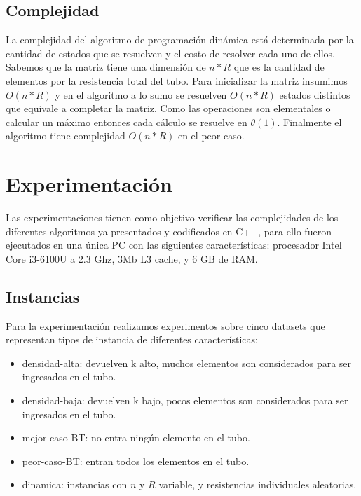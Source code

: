 \documentclass[10pt,a4paper]{article}
\begin{document}
\subsection{Complejidad}
La complejidad del algoritmo de programación dinámica está determinada por la cantidad de estados que se resuelven y el costo de resolver cada uno de ellos.
Sabemos que la matriz tiene una dimensión de $n * R$ que es la cantidad de elementos por la resistencia total del tubo. Para inicializar la matriz insumimos $O(n * R)$ y en el algoritmo a lo sumo se resuelven $O(n * R)$ estados distintos que equivale a completar la matriz. Como las operaciones son elementales o calcular un máximo entonces cada cálculo se resuelve en $\theta(1)$. Finalmente el algoritmo tiene complejidad $O(n * R)$ en el peor caso.

\section{Experimentación} \label{sec:experimentacion}
Las experimentaciones tienen como objetivo verificar las complejidades de los diferentes algoritmos ya presentados y codificados en C++, para ello fueron ejecutados en una única PC con las siguientes características: procesador Intel Core i3-6100U a 2.3 Ghz, 3Mb L3 cache, y 6 GB de RAM.

\subsection{Instancias} \label{instancias}
Para la experimentación realizamos experimentos sobre cinco datasets que representan tipos de instancia de diferentes características:
\begin{itemize}
	\item densidad-alta: devuelven k alto, muchos elementos son considerados para ser ingresados en el tubo.
	\item densidad-baja: devuelven k bajo, pocos elementos son considerados para ser ingresados en el tubo.
	\item mejor-caso-BT: no entra ningún elemento en el tubo.
	\item peor-caso-BT: entran todos los elementos en el tubo.
	\item dinamica: instancias con $n$ y $R$ variable, y resistencias individuales aleatorias.
\end{itemize}
\end{document}
